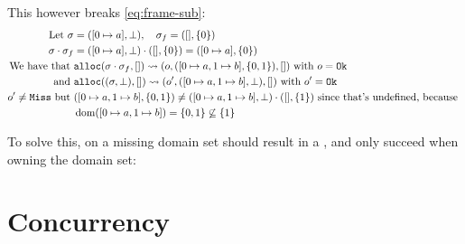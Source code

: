 
This however breaks \ref{eq:frame-sub}:
\begin{align*}
    \text{Let }\sigma &= ([0\mapsto a], \bot), \quad \sigma_f=([],\{0\}) \\
    \sigma\cdot\sigma_f&=([0\mapsto a],\bot) \cdot ([], \{0\})=([0\mapsto a],\{0\}) \\
    \text{We have that }&\texttt{alloc}(\sigma\cdot\sigma_f,[])\rightsquigarrow(o,([0\mapsto a,1\mapsto b], \{0, 1\}),[])\text{ with }o=\texttt{Ok}\\
    \text{and }&\texttt{alloc}((\sigma,\bot),[])\rightsquigarrow(o',([0\mapsto a, 1\mapsto b], \bot), []) \text{ with }o'=\texttt{Ok}\\
    \text{$o'\neq\texttt{Miss}$ but } 
    &([0\mapsto a, 1\mapsto b], \{0, 1\}) \neq ([0\mapsto a, 1\mapsto b], \bot)\cdot  ([], \{1\}) \text{ since that's undefined, because }\\
    &\operatorname{dom}([0\mapsto a,1\mapsto b])=\{0,1\}\not\subseteq \{1\}
\end{align*}

To solve this, \alloc{} on a missing domain set should result in a \Miss, and only succeed when owning the domain set:

\section{Concurrency}

